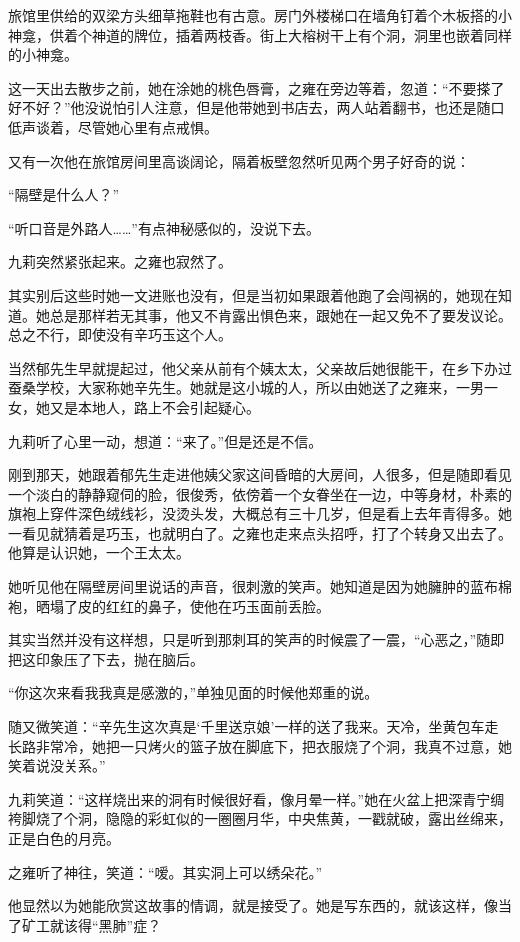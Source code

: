 \par 旅馆里供给的双梁方头细草拖鞋也有古意。房门外楼梯口在墙角钉着个木板搭的小神龛，供着个神道的牌位，插着两枝香。街上大榕树干上有个洞，洞里也嵌着同样的小神龛。
\par 这一天出去散步之前，她在涂她的桃色唇膏，之雍在旁边等着，忽道：“不要搽了好不好？”他没说怕引人注意，但是他带她到书店去，两人站着翻书，也还是随口低声谈着，尽管她心里有点戒惧。
\par 又有一次他在旅馆房间里高谈阔论，隔着板壁忽然听见两个男子好奇的说：
\par “隔壁是什么人？”
\par “听口音是外路人……”有点神秘感似的，没说下去。
\par 九莉突然紧张起来。之雍也寂然了。
\par 其实别后这些时她一文进账也没有，但是当初如果跟着他跑了会闯祸的，她现在知道。她总是那样若无其事，他又不肯露出惧色来，跟她在一起又免不了要发议论。总之不行，即使没有辛巧玉这个人。
\par 当然郁先生早就提起过，他父亲从前有个姨太太，父亲故后她很能干，在乡下办过蚕桑学校，大家称她辛先生。她就是这小城的人，所以由她送了之雍来，一男一女，她又是本地人，路上不会引起疑心。
\par 九莉听了心里一动，想道：“来了。”但是还是不信。
\par 刚到那天，她跟着郁先生走进他姨父家这间昏暗的大房间，人很多，但是随即看见一个淡白的静静窥伺的脸，很俊秀，依傍着一个女眷坐在一边，中等身材，朴素的旗袍上穿件深色绒线衫，没烫头发，大概总有三十几岁，但是看上去年青得多。她一看见就猜着是巧玉，也就明白了。之雍也走来点头招呼，打了个转身又出去了。他算是认识她，一个王太太。
\par 她听见他在隔壁房间里说话的声音，很刺激的笑声。她知道是因为她臃肿的蓝布棉袍，晒塌了皮的红红的鼻子，使他在巧玉面前丢脸。
\par 其实当然并没有这样想，只是听到那刺耳的笑声的时候震了一震，“心恶之，”随即把这印象压了下去，抛在脑后。
\par “你这次来看我我真是感激的，”单独见面的时候他郑重的说。
\par 随又微笑道：“辛先生这次真是‘千里送京娘’一样的送了我来。天冷，坐黄包车走长路非常冷，她把一只烤火的篮子放在脚底下，把衣服烧了个洞，我真不过意，她笑着说没关系。”
\par 九莉笑道：“这样烧出来的洞有时候很好看，像月晕一样。”她在火盆上把深青宁绸袴脚烧了个洞，隐隐的彩虹似的一圈圈月华，中央焦黄，一戳就破，露出丝绵来，正是白色的月亮。
\par 之雍听了神往，笑道：“嗳。其实洞上可以绣朵花。”
\par 他显然以为她能欣赏这故事的情调，就是接受了。她是写东西的，就该这样，像当了矿工就该得“黑肺”症？
